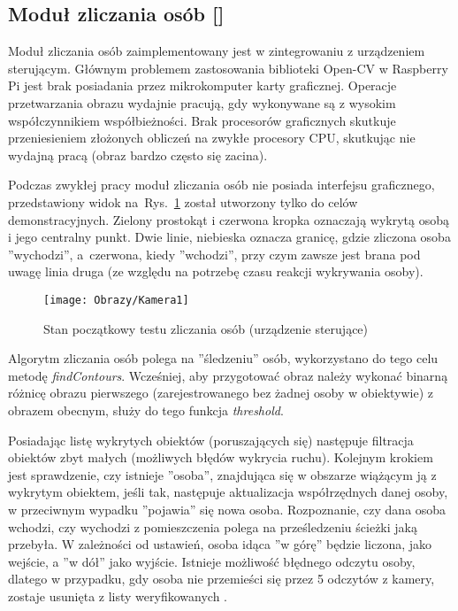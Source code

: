 \subsection{Moduł zliczania osób [\StudentA]}
	Moduł zliczania osób zaimplementowany jest w zintegrowaniu z urządzeniem sterującym. Głównym problemem zastosowania biblioteki Open-CV w Raspberry Pi jest brak posiadania przez mikrokomputer karty graficznej. Operacje przetwarzania obrazu wydajnie pracują, gdy wykonywane są z wysokim współczynnikiem współbieżności. Brak procesorów graficznych skutkuje przeniesieniem złożonych obliczeń na zwykłe procesory CPU, skutkując nie wydajną pracą (obraz bardzo często się zacina). 
	
	Podczas zwykłej pracy moduł zliczania osób nie posiada interfejsu graficznego, przedstawiony widok na~Rys.~\ref{rys:Zliczanie osob} został utworzony tylko do celów demonstracyjnych. Zielony prostokąt i czerwona kropka oznaczają wykrytą osobą i jego centralny punkt. Dwie linie, niebieska oznacza granicę, gdzie zliczona osoba ''wychodzi'', a~czerwona, kiedy ''wchodzi'', przy czym zawsze jest brana pod uwagę linia druga (ze względu na potrzebę czasu reakcji wykrywania osoby).
	
	\begin{figure}[ht!]
		\centering
		\texttt{[image: Obrazy/Kamera1]}
		\caption{Stan początkowy testu zliczania osób (urządzenie sterujące)}
		\label{rys:Zliczanie osob}
	\end{figure}
	
	Algorytm zliczania osób polega na ''śledzeniu'' osób, wykorzystano do tego celu metodę \textit{findContours}. Wcześniej, aby przygotować obraz należy wykonać binarną różnicę obrazu pierwszego (zarejestrowanego bez żadnej osoby w obiektywie) z obrazem obecnym, służy do tego funkcja \textit{threshold}. 
	
	Posiadając listę wykrytych obiektów (poruszających się) następuje filtracja obiektów zbyt małych (możliwych błędów wykrycia ruchu). Kolejnym krokiem jest sprawdzenie, czy istnieje ''osoba'', znajdująca się w obszarze wiążącym ją z wykrytym obiektem, jeśli tak, następuje aktualizacja współrzędnych danej osoby, w przeciwnym wypadku ''pojawia'' się nowa osoba. Rozpoznanie, czy dana osoba wchodzi, czy wychodzi z pomieszczenia polega na prześledzeniu ścieżki jaką przebyła. W zależności od ustawień, osoba idąca ''w górę'' będzie liczona, jako wejście, a ''w dół'' jako wyjście. Istnieje możliwość błędnego odczytu osoby, dlatego w przypadku, gdy osoba nie przemieści się przez 5 odczytów z kamery, zostaje usunięta z listy weryfikowanych \cite{rozpoznawanie_twarzy}.